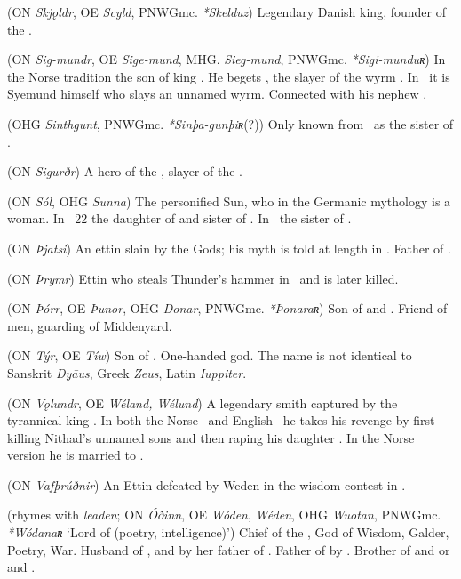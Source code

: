 \begin{itemize}
 (ON \emph{Skjǫldr}, OE \emph{Scyld}, PNWGmc. \emph{*Skelduz})
  Legendary Danish king, founder of the .

 (ON \emph{Sig-mundr}, OE \emph{Sige-mund}, MHG. \emph{Sieg-mund}, PNWGmc. \emph{*Sigi-munduʀ})
  In the Norse tradition the son of king .  He begets , the slayer of the wyrm .  In \Beowulf\ it is Syemund himself who slays an unnamed wyrm.  Connected with his nephew .

 (OHG \emph{Sinthgunt}, PNWGmc. \emph{*Sinþa-gunþiʀ}(?))
  Only known from \MerseburgTwo\ as the sister of .

 (ON \emph{Sigurðr})
  A hero of the , slayer of the  .

 (ON \emph{Sól}, OHG \emph{Sunna})
  The personified Sun, who in the Germanic mythology is a woman.  In \Vafthrudnismal\ 22 the daughter of  and sister of .  In \MerseburgTwo\ the sister of .

 (ON \emph{Þjatsi})
  An ettin slain by the Gods; his myth is told at length in \Haustlong.  Father of .

 (ON \emph{Þrymr})
  Ettin who steals Thunder’s hammer in \Thrymskvida\ and is later killed.

 (ON \emph{Þórr}, OE \emph{Þunor}, OHG \emph{Donar}, PNWGmc. \emph{*Þonaraʀ})
  Son of  and .  Friend of men, guarding of Middenyard.

 (ON \emph{Týr}, OE \emph{Tíw})
  Son of .  One-handed god.  The name is not identical to Sanskrit \emph{Dyāus}, Greek \emph{Zeus}, Latin \emph{Iuppiter}.

 (ON \emph{Vǫlundr}, OE \emph{Wéland, Wélund})
  A legendary smith captured by the tyrannical king .  In both the Norse \Volundarkvida\ and English \Deor\ he takes his revenge by first killing Nithad’s unnamed sons and then raping his daughter .  In the Norse version he is married to .

 (ON \emph{Vafþrúðnir})
  An Ettin defeated by Weden in the wisdom contest in \Vafthrudnismal.

 (rhymes with \emph{leaden}; ON \emph{Óðinn}, OE \emph{Wóden}, \emph{Wéden}, OHG \emph{Wuotan}, PNWGmc. \emph{*Wódanaʀ} ‘Lord of  (poetry, intelligence)’)
  Chief of the , God of Wisdom, Galder, Poetry, War.  Husband of , and by her father of .  Father of  by .  Brother of  and  or  and .


\end{itemize}
